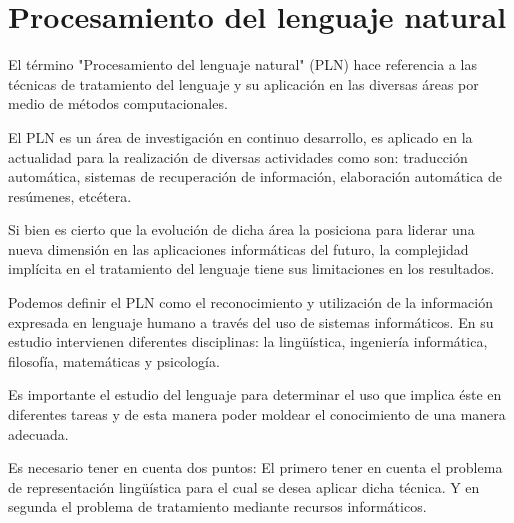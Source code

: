 \section{Procesamiento del lenguaje natural}

El t\'ermino "Procesamiento del lenguaje natural" (PLN) hace referencia a las t\'ecnicas de tratamiento del lenguaje y su aplicaci\'on en las diversas \'areas por medio de m\'etodos computacionales.  \cite{elprofesionaldelainformacion}

El PLN es un \'area de investigaci\'on en continuo desarrollo, es aplicado en la actualidad para la realizaci\'on de diversas actividades como son: traducci\'on autom\'atica, sistemas de recuperaci\'on de informaci\'on, elaboraci\'on autom\'atica de res\'umenes, etc\'etera.  \cite{elprofesionaldelainformacion}

Si bien es cierto que la evoluci\'on de dicha \'area la posiciona para liderar una nueva dimensi\'on en las aplicaciones inform\'aticas del futuro, la complejidad impl\'icita en el tratamiento del lenguaje tiene sus limitaciones en los resultados.

Podemos definir el PLN como el reconocimiento y utilizaci\'on de la informaci\'on expresada en lenguaje humano a trav\'es del uso de sistemas inform\'aticos. En su estudio intervienen diferentes disciplinas: la ling\"u\'istica, ingenier\'ia inform\'atica, filosof\'ia, matem\'aticas y psicolog\'ia. \cite{elprofesionaldelainformacion}

Es importante el estudio del lenguaje para determinar el uso que implica \'este en diferentes tareas y de esta manera poder moldear el conocimiento de una manera adecuada. \cite{elprofesionaldelainformacion}

Es necesario tener en cuenta dos puntos: El primero tener en cuenta el problema de representaci\'on ling\"u\'istica para el cual se desea aplicar dicha t\'ecnica. Y en segunda el problema de tratamiento mediante recursos inform\'aticos.
\pagebreak



